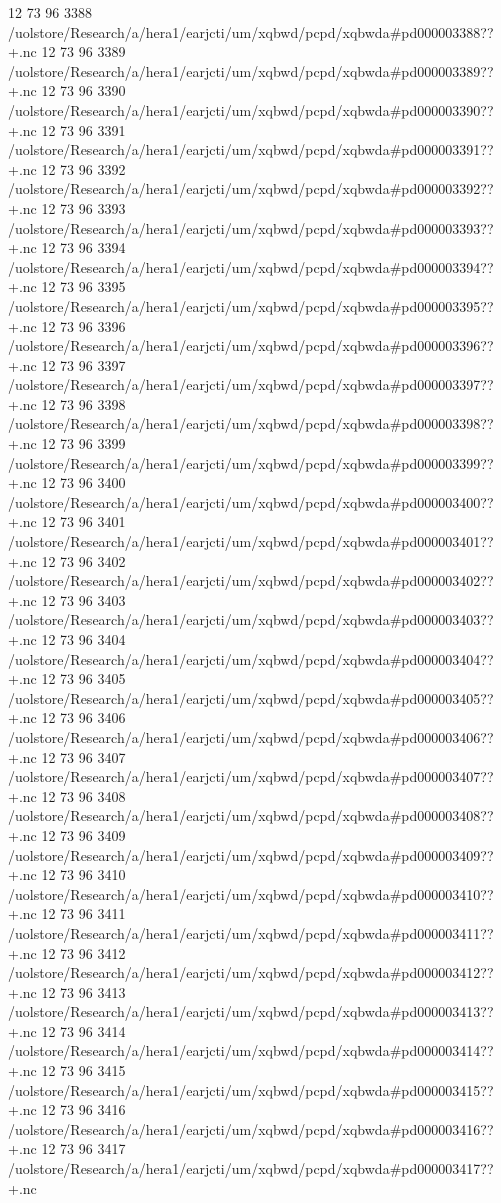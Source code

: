 12 73 96
3388
/uolstore/Research/a/hera1/earjcti/um/xqbwd/pcpd/xqbwda#pd000003388??+.nc
12 73 96
3389
/uolstore/Research/a/hera1/earjcti/um/xqbwd/pcpd/xqbwda#pd000003389??+.nc
12 73 96
3390
/uolstore/Research/a/hera1/earjcti/um/xqbwd/pcpd/xqbwda#pd000003390??+.nc
12 73 96
3391
/uolstore/Research/a/hera1/earjcti/um/xqbwd/pcpd/xqbwda#pd000003391??+.nc
12 73 96
3392
/uolstore/Research/a/hera1/earjcti/um/xqbwd/pcpd/xqbwda#pd000003392??+.nc
12 73 96
3393
/uolstore/Research/a/hera1/earjcti/um/xqbwd/pcpd/xqbwda#pd000003393??+.nc
12 73 96
3394
/uolstore/Research/a/hera1/earjcti/um/xqbwd/pcpd/xqbwda#pd000003394??+.nc
12 73 96
3395
/uolstore/Research/a/hera1/earjcti/um/xqbwd/pcpd/xqbwda#pd000003395??+.nc
12 73 96
3396
/uolstore/Research/a/hera1/earjcti/um/xqbwd/pcpd/xqbwda#pd000003396??+.nc
12 73 96
3397
/uolstore/Research/a/hera1/earjcti/um/xqbwd/pcpd/xqbwda#pd000003397??+.nc
12 73 96
3398
/uolstore/Research/a/hera1/earjcti/um/xqbwd/pcpd/xqbwda#pd000003398??+.nc
12 73 96
3399
/uolstore/Research/a/hera1/earjcti/um/xqbwd/pcpd/xqbwda#pd000003399??+.nc
12 73 96
3400
/uolstore/Research/a/hera1/earjcti/um/xqbwd/pcpd/xqbwda#pd000003400??+.nc
12 73 96
3401
/uolstore/Research/a/hera1/earjcti/um/xqbwd/pcpd/xqbwda#pd000003401??+.nc
12 73 96
3402
/uolstore/Research/a/hera1/earjcti/um/xqbwd/pcpd/xqbwda#pd000003402??+.nc
12 73 96
3403
/uolstore/Research/a/hera1/earjcti/um/xqbwd/pcpd/xqbwda#pd000003403??+.nc
12 73 96
3404
/uolstore/Research/a/hera1/earjcti/um/xqbwd/pcpd/xqbwda#pd000003404??+.nc
12 73 96
3405
/uolstore/Research/a/hera1/earjcti/um/xqbwd/pcpd/xqbwda#pd000003405??+.nc
12 73 96
3406
/uolstore/Research/a/hera1/earjcti/um/xqbwd/pcpd/xqbwda#pd000003406??+.nc
12 73 96
3407
/uolstore/Research/a/hera1/earjcti/um/xqbwd/pcpd/xqbwda#pd000003407??+.nc
12 73 96
3408
/uolstore/Research/a/hera1/earjcti/um/xqbwd/pcpd/xqbwda#pd000003408??+.nc
12 73 96
3409
/uolstore/Research/a/hera1/earjcti/um/xqbwd/pcpd/xqbwda#pd000003409??+.nc
12 73 96
3410
/uolstore/Research/a/hera1/earjcti/um/xqbwd/pcpd/xqbwda#pd000003410??+.nc
12 73 96
3411
/uolstore/Research/a/hera1/earjcti/um/xqbwd/pcpd/xqbwda#pd000003411??+.nc
12 73 96
3412
/uolstore/Research/a/hera1/earjcti/um/xqbwd/pcpd/xqbwda#pd000003412??+.nc
12 73 96
3413
/uolstore/Research/a/hera1/earjcti/um/xqbwd/pcpd/xqbwda#pd000003413??+.nc
12 73 96
3414
/uolstore/Research/a/hera1/earjcti/um/xqbwd/pcpd/xqbwda#pd000003414??+.nc
12 73 96
3415
/uolstore/Research/a/hera1/earjcti/um/xqbwd/pcpd/xqbwda#pd000003415??+.nc
12 73 96
3416
/uolstore/Research/a/hera1/earjcti/um/xqbwd/pcpd/xqbwda#pd000003416??+.nc
12 73 96
3417
/uolstore/Research/a/hera1/earjcti/um/xqbwd/pcpd/xqbwda#pd000003417??+.nc
